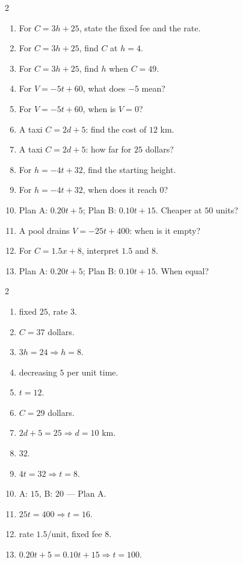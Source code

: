 \documentclass[11pt]{article}
\begin{document}
\begin{recapbox}
\begin{multicols}{2}
\small
\begin{enumerate}[leftmargin=*,itemsep=3pt]
  \item For $C=3h+25$, state the fixed fee and the rate.
  \item For $C=3h+25$, find $C$ at $h=4$.
  \item For $C=3h+25$, find $h$ when $C=49$.
  \item For $V=-5t+60$, what does $-5$ mean?
  \item For $V=-5t+60$, when is $V=0$?
  \item A taxi $C=2d+5$: find the cost of $12$ km.
  \item A taxi $C=2d+5$: how far for $25$ dollars?
  \item For $h=-4t+32$, find the starting height.
  \item For $h=-4t+32$, when does it reach $0$?
  \item Plan A: $0.20t+5$; Plan B: $0.10t+15$. Cheaper at $50$ units?
  \item A pool drains $V=-25t+400$: when is it empty?
  \item For $C=1.5x+8$, interpret $1.5$ and $8$.
  \item Plan A: $0.20t+5$; Plan B: $0.10t+15$. When equal?
\end{enumerate}
\end{multicols}
\end{recapbox}

\begin{keybox}
\begin{multicols}{2}
\small
\begin{enumerate}[leftmargin=*,itemsep=3pt]
  \item fixed $25$, rate $3$.
  \item $C=37$ dollars.
  \item $3h=24\Rightarrow h=8$.
  \item decreasing $5$ per unit time.
  \item $t=12$.
  \item $C=29$ dollars.
  \item $2d+5=25\Rightarrow d=10$ km.
  \item $32$.
  \item $4t=32\Rightarrow t=8$.
  \item A: $15$, B: $20$ — Plan A.
  \item $25t=400\Rightarrow t=16$.
  \item rate $1.5$/unit, fixed fee $8$.
  \item $0.20t+5=0.10t+15\Rightarrow t=100$.
\end{enumerate}
\end{multicols}
\end{keybox}
\end{document}
